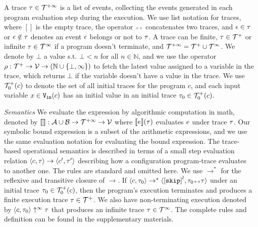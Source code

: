 A trace $\mathtt{\tau} \in \mathcal{T}^{+\infty}$ is a list of events, 
collecting the events generated in each program evaluation step during the execution. 
We use list notation for traces, where $[]$ is the empty trace,
the operator ${\scriptscriptstyle ++}$ concatenates two traces, and $\mathtt{\epsilon} \in \mathtt{\tau}$ or $\mathtt{\epsilon} \notin \mathtt{\tau}$ denotes an event $\mathtt{\epsilon}$ belongs or not to $\mathtt{\tau}$.
{
A trace can be finite, $\mathtt{\tau} \in \mathcal{T}^{+}$ or infinite $\mathtt{\tau} \in \mathcal{T}^{\infty}$ if a program doesn't terminate,
and $\mathcal{T}^{+\infty} = \mathcal{T}^{+} \cup \mathcal{T}^{\infty}$.
}
We denote by $\bot$ a value s.t. $\bot < n $ for all $n \in \mathbb{N}$, and we use the operator $\rho: {\mathcal{T}^{+}} \to \mathcal{V} \to(\mathbb{N} \cup \{\bot, \infty\})$ to fetch the latest value assigned to a variable in the trace, which returns $\bot$ if the variable doesn't have a value in the trace.
We use $\mathcal{T}^{+}_0(c)$ to denote the set of all initial traces for the program $c$, and each input variable $x \in {\ensuremath{\mathtt{V_{\mathtt{in}}}}}(c)$ has an initial value in an initial trace $\mathtt{\tau}_0 \in \mathcal{T}^{+}_0(c)$.

\emph{Semantics}
We evaluate the expression by algorithmic computation in math, denoted by
$\llbracket  \rrbracket : \mathcal{A} \cup \mathcal{B} \to \mathcal{T}^{+\infty} \to \mathcal{V}$ where
$\llbracket e \rrbracket(\mathtt{\tau})$ evaluates $e$ under trace $\mathtt{\tau}$.
Our symbolic bound expression is a subset of the arithmetic expressions, and we use the same evaluation notation for evaluating the bound expression.
The trace-based operational semantics is described in terms of a small step evaluation relation $\langle c, \mathtt{\tau} \rangle \to \langle c', \mathtt{\tau}' \rangle$ describing how a configuration program-trace evaluates to another
one.
The rules are standard and omitted here.
We use $\to^*$ for the reflexive and transitive closure of $\to$. 
If $\config{c, \trace_0} \rightarrow^{*} \config{\clabel{\eskip}^l, \trace_0 \tracecat \trace}$ under an initial trace 
$\mathtt{\tau}_0 \in \mathcal{T}^{+}_0(c)$,
then the program's execution terminates and produces a finite execution trace $\mathtt{\tau} \in \mathcal{T}^{+}$. We also have non-terminating execution denoted by $\langle c, \mathtt{\tau}_0 \rangle \uparrow^{\infty} \mathtt{\tau}$ that produces an infinite trace $\mathtt{\tau} \in \mathcal{T}^{\infty}$. The complete rules and definition can be found in the supplementary materials.